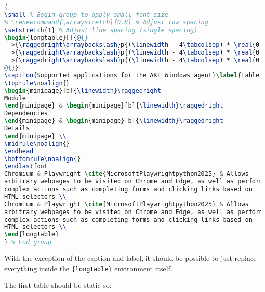 \begin{lstlisting}[language=TeX]
{
\small % Begin group to apply small font size
% \renewcommand{\arraystretch}{0.8} % Adjust row spacing
\setstretch{1} % Adjust line spacing (single spacing)
\begin{longtable}[]{@{}
  >{\raggedright\arraybackslash}p{(\linewidth - 4\tabcolsep) * \real{0.20}}
  >{\raggedright\arraybackslash}p{(\linewidth - 4\tabcolsep) * \real{0.20}}
  >{\raggedright\arraybackslash}p{(\linewidth - 4\tabcolsep) * \real{0.60}}
@{}}
\caption{Supported applications for the AKF Windows agent}\label{table:akf-applications} \\
\toprule\noalign{}
\begin{minipage}[b]{\linewidth}\raggedright
Module
\end{minipage} & \begin{minipage}[b]{\linewidth}\raggedright
Dependencies
\end{minipage} & \begin{minipage}[b]{\linewidth}\raggedright
Details
\end{minipage} \\
\midrule\noalign{}
\endhead
\bottomrule\noalign{}
\endlastfoot
Chromium & Playwright \cite{MicrosoftPlaywrightpython2025} & Allows
arbitrary webpages to be visited on Chrome and Edge, as well as perform
complex actions such as completing forms and clicking links based on
HTML selectors \\
Chromium & Playwright \cite{MicrosoftPlaywrightpython2025} & Allows
arbitrary webpages to be visited on Chrome and Edge, as well as perform
complex actions such as completing forms and clicking links based on
HTML selectors \\
\end{longtable}
} % End group
\end{lstlisting}

With the exception of the caption and label, it should be possible to
just replace everything inside the
\passthrough{\lstinline!\{longtable\}!} environment itself.

The first table should be static so:

